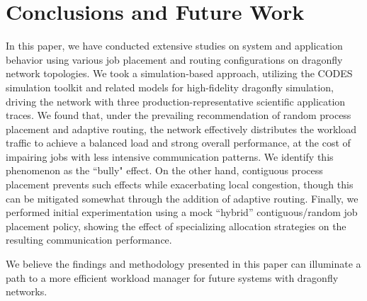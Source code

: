 \section{Conclusions and Future Work}
\label{sec:conclusion}

In this paper, we have conducted extensive studies on system and application behavior using various job placement and routing configurations on dragonfly network topologies. We took a simulation-based approach, utilizing the CODES simulation toolkit and related models for high-fidelity dragonfly simulation, driving the network with three production-representative scientific application traces. We found that, under the prevailing recommendation of random process placement and adaptive routing, the network effectively distributes the workload traffic to achieve a balanced load and strong overall performance, at the cost of impairing jobs with less intensive communication patterns. We identify this phenomenon as the ``bully" effect. On the other hand, contiguous process placement prevents such effects while exacerbating local congestion, though this can be mitigated somewhat through the addition of adaptive routing. Finally, we performed initial experimentation using a mock ``hybrid'' contiguous/random job placement policy, showing the effect of specializing allocation strategies on the resulting communication performance.

We believe the findings and methodology presented in this paper can illuminate a path to a more efficient workload manager for future systems with dragonfly networks. 

